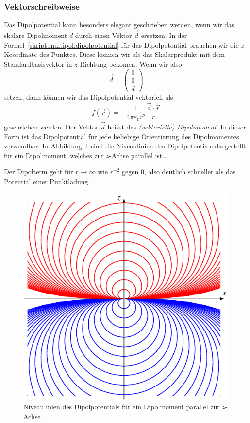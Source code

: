 \subsubsection{Vektorschreibweise}
Das Dipolpotential kann besonders elegant geschrieben werden, wenn
wir das skalare Dipolmoment $d$ durch einen Vektor $\vec{d}$ ersetzen.
In der Formel~\eqref{skript:multipol:dipolpotential}
für das Dipolpotential brauchen wir die $z$-Koordinate
des Punktes.
Diese können wir als das Skalarprodukt mit dem Standardbasisvektor
in $z$-Richtung bekomen.
Wenn wir also
\[
\vec{d}=\begin{pmatrix}0\\0\\d\end{pmatrix}
\]
setzen, dann können wir das Dipolpotential vektoriell als
\begin{equation*}
f(\vec{r})
=
-
\frac{1}{4\pi\varepsilon_0r^2} \frac{\vec{d}\cdot\vec{r}}{r}
\end{equation*}
geschrieben werden.
Der Vektor $\vec d$ heisst das {\em (vektorielle) Dipolmoment}.
%
In dieser Form ist das Dipolpotential für jede beliebige Orientierung
des Dipolmomentes verwendbar.
In Abbildung~\ref{chapter:multipol:dipolniveaux} sind die Niveaulinien
des Dipolpotentials dargestellt für ein Dipolmoment, welches zur
$z$-Achse parallel ist..

Der Dipolterm geht für $r\to\infty$ wie $r^{-2}$ gegen $0$, also
deutlich schneller als das Potential einer Punktladung.

\begin{figure}
\centering
\includegraphics{chapters/tikz/dipol3.pdf}
\caption{Niveaulinien des Dipolpotentials für ein Dipolmoment
parallel zur $z$-Achse
\label{chapter:multipol:dipolniveaux}}
\end{figure}

